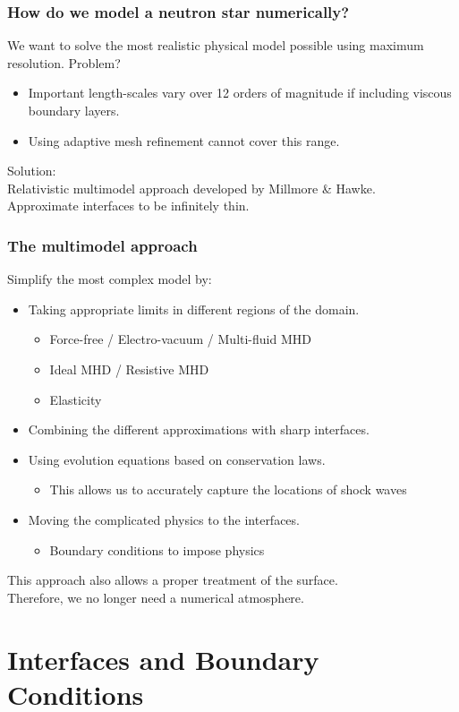 \documentclass{beamer}
\begin{document}
\begin{frame}
\frametitle{How do we model a neutron star numerically?}
We want to solve the most realistic physical model possible using maximum resolution. Problem?
\begin{itemize}
\item{Important length-scales vary over 12 orders of magnitude if including viscous boundary layers.}
\item{Using adaptive mesh refinement cannot cover this range.}
\end{itemize}
Solution: \\
Relativistic multimodel approach developed by Millmore \& Hawke. \\
Approximate interfaces to be infinitely thin.
\end{frame}

\begin{frame}
\frametitle{The multimodel approach}
Simplify the most complex model by:
\begin{itemize}
\item{Taking appropriate limits in different regions of the domain.}
\begin{itemize}
\item{Force-free / Electro-vacuum / Multi-fluid MHD}
\item{Ideal MHD / Resistive MHD}
\item{Elasticity}
\end{itemize}
\item{Combining the different approximations with sharp interfaces.}
\item{Using evolution equations based on conservation laws.}
\begin{itemize}
\item{This allows us to accurately capture the locations of shock waves}
\end{itemize}
\item{Moving the complicated physics to the interfaces.}
\begin{itemize}
\item{Boundary conditions to impose physics}
\end{itemize}
\end{itemize}
This approach also allows a proper treatment of the surface. \\
Therefore, we no longer need a numerical atmosphere. 
\end{frame}

\section{Interfaces and Boundary Conditions}
\end{document}

